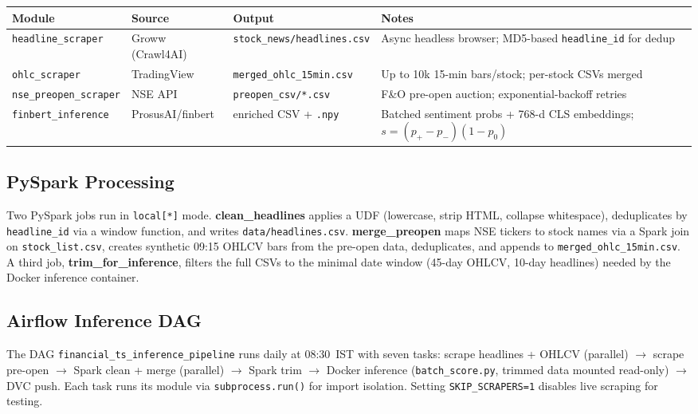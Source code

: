 \documentclass[11pt,a4paper]{article}
\begin{document}
\begin{table}[H]
\centering
\small
\begin{tabular}{@{}lllp{5.8cm}@{}}
\toprule
\textbf{Module} & \textbf{Source} & \textbf{Output} & \textbf{Notes} \\
\midrule
\texttt{headline\_scraper} & Groww (Crawl4AI) & \texttt{stock\_news/headlines.csv}
  & Async headless browser; MD5-based \texttt{headline\_id} for dedup \\
\texttt{ohlc\_scraper} & TradingView & \texttt{merged\_ohlc\_15min.csv}
  & Up to 10k 15-min bars/stock; per-stock CSVs merged \\
\texttt{nse\_preopen\_scraper} & NSE API & \texttt{preopen\_csv/*.csv}
  & F\&O pre-open auction; exponential-backoff retries \\
\texttt{finbert\_inference} & ProsusAI/finbert & enriched CSV + \texttt{.npy}
  & Batched sentiment probs + 768-d CLS embeddings;
    $s = (p_+ - p_-)(1 - p_0)$ \\
\bottomrule
\end{tabular}
\end{table}

\subsection{PySpark Processing}

Two PySpark jobs run in \texttt{local[*]} mode.
\textbf{clean\_headlines} applies a UDF (lowercase, strip HTML, collapse
whitespace), deduplicates by \texttt{headline\_id} via a window function,
and writes \texttt{data/headlines.csv}.
\textbf{merge\_preopen} maps NSE tickers to stock names via a Spark join on
\texttt{stock\_list.csv}, creates synthetic 09:15 OHLCV bars from the pre-open
data, deduplicates, and appends to \texttt{merged\_ohlc\_15min.csv}.
A third job, \textbf{trim\_for\_inference}, filters the full CSVs to the
minimal date window (45-day OHLCV, 10-day headlines) needed by the Docker
inference container.

\subsection{Airflow Inference DAG}

The DAG \texttt{financial\_ts\_inference\_pipeline} runs daily at 08:30~IST
with seven tasks:
scrape headlines + OHLCV (parallel) $\to$ scrape pre-open $\to$
Spark clean + merge (parallel) $\to$ Spark trim $\to$
Docker inference (\texttt{batch\_score.py}, trimmed data mounted read-only)
$\to$ DVC push.
Each task runs its module via \texttt{subprocess.run()} for import isolation.
Setting \texttt{SKIP\_SCRAPERS=1} disables live scraping for testing.
\end{document}
